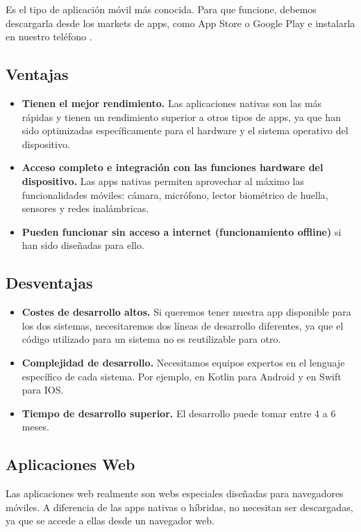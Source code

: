 Es el tipo de aplicación móvil más conocida. Para que funcione, debemos descargarla desde los markets de apps, como App Store o Google Play e instalarla en nuestro teléfono \cite{ref11}.

\subsection*{Ventajas}
\begin{itemize}
	\item \textbf{Tienen el mejor rendimiento.} Las aplicaciones nativas son las más rápidas y tienen un rendimiento superior a otros tipos de apps, ya que han sido optimizadas específicamente para el hardware y el sistema operativo del dispositivo.
	\item \textbf{Acceso completo e integración con las funciones hardware del dispositivo.} Las apps nativas permiten aprovechar al máximo las funcionalidades móviles: cámara, micrófono, lector biométrico de huella, sensores y redes inalámbricas.
	\item \textbf{Pueden funcionar sin acceso a internet (funcionamiento offline)} si han sido diseñadas para ello.
\end{itemize}

\subsection*{Desventajas}
\begin{itemize}
	\item \textbf{Costes de desarrollo altos.} Si queremos tener nuestra app disponible para los dos sistemas, necesitaremos dos líneas de desarrollo diferentes, ya que el código utilizado para un sistema no es reutilizable para otro.
	\item \textbf{Complejidad de desarrollo.} Necesitamos equipos expertos en el lenguaje específico de cada sistema. Por ejemplo, en Kotlin para Android y en Swift para IOS.
	\item \textbf{Tiempo de desarrollo superior.} El desarrollo puede tomar entre 4 a 6 meses.
\end{itemize}

\subsection{Aplicaciones Web}

Las aplicaciones web realmente son webs especiales diseñadas para navegadores móviles. A diferencia de las apps nativas o híbridas, no necesitan ser descargadas, ya que se accede a ellas desde un navegador web.

